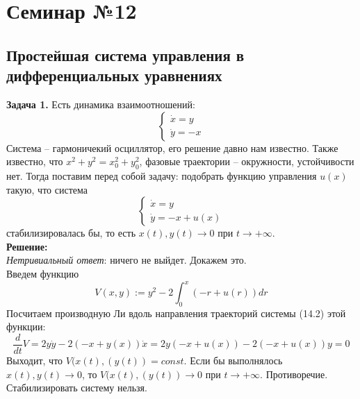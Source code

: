 \documentclass[10pt]{report}
\begin{document}
\chapter[{Семинар №12}]{Семинар №12}
\thispagestyle{empty}
\section {Простейшая система управления в дифференциальных уравнениях}
\textbf{Задача 1.} Есть динамика взаимоотношений:
\begin{equation}
\left\{
\begin{array}{lr}
\dot{x}=y\\
\dot{y}=-x
\end{array}
\right.
\end{equation}
Система -- гармоничекий осциллятор, его решение давно нам известно. Также известно, что $x^2+y^2=x_0^2+y_0^2$, фазовые траектории -- окружности, устойчивости нет. Тогда поставим перед собой задачу: подобрать функцию управления $u(x)$ такую, что система 
\begin{equation}
\left\{
\begin{array}{lr}
\dot{x}=y\\
\dot{y}=-x+u(x)
\end{array}
\right.
\end{equation}
стабилизировалась бы,  то есть $x(t), y(t) \rightarrow 0$ при $t\rightarrow+\infty$.\\

\textbf{Решение:}\\
\textit{Нетривиальный ответ}: ничего не выйдет. Докажем это. \\
Введем функцию 
\[ V(x,y):=y^2-2\int^x_0(-r+u(r))dr\]
Посчитаем производную Ли вдоль направления траекторий системы (14.2) этой функции:
\[\frac {d} {dt} V= 2y\dot y -2(-x+y(x))\dot x =2y(-x+u(x))-2(-x+u(x))y=0\]
Выходит, что $V(x(t),(y(t))=const$. Если бы выполнялось $x(t), y(t) \rightarrow 0$, то $V(x(t),(y(t))\rightarrow 0$ при $t\rightarrow+\infty$. Противоречие. Стабилизировать систему нельзя.
\end{document}

